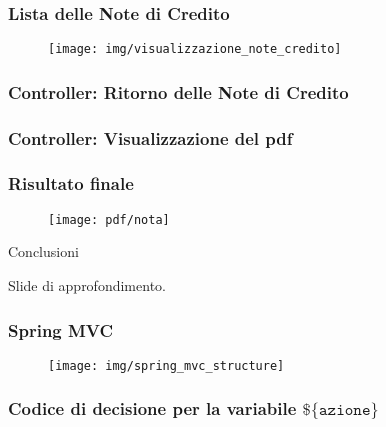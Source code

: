 \documentclass[]{beamer}
\begin{document}
    \begin{frame}
        \frametitle{Lista delle Note di Credito}
        \begin{figure}[H]
            \centering
            \texttt{[image: img/visualizzazione\_note\_credito]}\label{fig:visualizzazione}
        \end{figure}
    \end{frame}

    \begin{frame}
        \frametitle{Controller: Ritorno delle Note di Credito}
        
    \end{frame}

    \begin{frame}
        \frametitle{Controller: Visualizzazione del pdf}
        
    \end{frame}

    \begin{frame}
        \frametitle{Risultato finale}
        \begin{figure}[H]
            \texttt{[image: pdf/nota]}\label{fig:nota}
        \end{figure}
    \end{frame}

    \begin{frame}
        \begin{center}          
            \huge Conclusioni
        \end{center}
    \end{frame}

    \begin{frame}
        \begin{center}
            \huge Slide di approfondimento. 
        \end{center}
    \end{frame}

    \begin{frame}
        \frametitle{Spring MVC}
        \begin{figure}[H]
            \centering
            \texttt{[image: img/spring\_mvc\_structure]}\label{spring:diagram}
        \end{figure}
    \end{frame}

    \begin{frame}
        \frametitle{Codice di decisione per la variabile \(\texttt{\$\{azione\}}\)}
        
    \end{frame}
\end{document}
